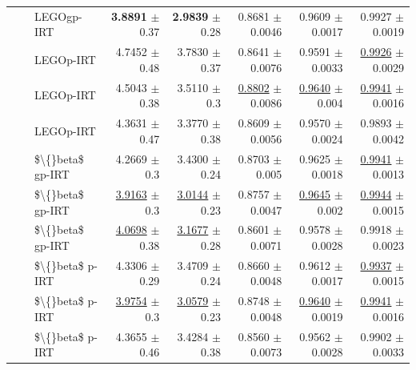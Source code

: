 \begin{longtable}{llp{}rrrrr}
 &  & LEGOgp-IRT & \textbf{3.8891} {\scriptsize $\pm$ 0.37} & \textbf{2.9839} {\scriptsize $\pm$ 0.28} & 0.8681 {\scriptsize $\pm$ 0.0046} & 0.9609 {\scriptsize $\pm$ 0.0017} & 0.9927 {\scriptsize $\pm$ 0.0019} \\
 &  & LEGOp-IRT & 4.7452 {\scriptsize $\pm$ 0.48} & 3.7830 {\scriptsize $\pm$ 0.37} & 0.8641 {\scriptsize $\pm$ 0.0076} & 0.9591 {\scriptsize $\pm$ 0.0033} & \underline{0.9926} {\scriptsize $\pm$ 0.0029} \\
 &  & LEGOp-IRT & 4.5043 {\scriptsize $\pm$ 0.38} & 3.5110 {\scriptsize $\pm$ 0.3} & \underline{0.8802} {\scriptsize $\pm$ 0.0086} & \underline{0.9640} {\scriptsize $\pm$ 0.004} & \underline{0.9941} {\scriptsize $\pm$ 0.0016} \\
 &  & LEGOp-IRT & 4.3631 {\scriptsize $\pm$ 0.47} & 3.3770 {\scriptsize $\pm$ 0.38} & 0.8609 {\scriptsize $\pm$ 0.0056} & 0.9570 {\scriptsize $\pm$ 0.0024} & 0.9893 {\scriptsize $\pm$ 0.0042} \\
 &  & \$\textbackslash\{\}beta\$ gp-IRT & 4.2669 {\scriptsize $\pm$ 0.3} & 3.4300 {\scriptsize $\pm$ 0.24} & 0.8703 {\scriptsize $\pm$ 0.005} & 0.9625 {\scriptsize $\pm$ 0.0018} & \underline{0.9941} {\scriptsize $\pm$ 0.0013} \\
 &  & \$\textbackslash\{\}beta\$ gp-IRT & \underline{3.9163} {\scriptsize $\pm$ 0.3} & \underline{3.0144} {\scriptsize $\pm$ 0.23} & 0.8757 {\scriptsize $\pm$ 0.0047} & \underline{0.9645} {\scriptsize $\pm$ 0.002} & \underline{0.9944} {\scriptsize $\pm$ 0.0015} \\
 &  & \$\textbackslash\{\}beta\$ gp-IRT & \underline{4.0698} {\scriptsize $\pm$ 0.38} & \underline{3.1677} {\scriptsize $\pm$ 0.28} & 0.8601 {\scriptsize $\pm$ 0.0071} & 0.9578 {\scriptsize $\pm$ 0.0028} & 0.9918 {\scriptsize $\pm$ 0.0023} \\
 &  & \$\textbackslash\{\}beta\$ p-IRT & 4.3306 {\scriptsize $\pm$ 0.29} & 3.4709 {\scriptsize $\pm$ 0.24} & 0.8660 {\scriptsize $\pm$ 0.0048} & 0.9612 {\scriptsize $\pm$ 0.0017} & \underline{0.9937} {\scriptsize $\pm$ 0.0015} \\
 &  & \$\textbackslash\{\}beta\$ p-IRT & \underline{3.9754} {\scriptsize $\pm$ 0.3} & \underline{3.0579} {\scriptsize $\pm$ 0.23} & 0.8748 {\scriptsize $\pm$ 0.0048} & \underline{0.9640} {\scriptsize $\pm$ 0.0019} & \underline{0.9941} {\scriptsize $\pm$ 0.0016} \\
 &  & \$\textbackslash\{\}beta\$ p-IRT & 4.3655 {\scriptsize $\pm$ 0.46} & 3.4284 {\scriptsize $\pm$ 0.38} & 0.8560 {\scriptsize $\pm$ 0.0073} & 0.9562 {\scriptsize $\pm$ 0.0028} & 0.9902 {\scriptsize $\pm$ 0.0033} \\

\end{longtable}
